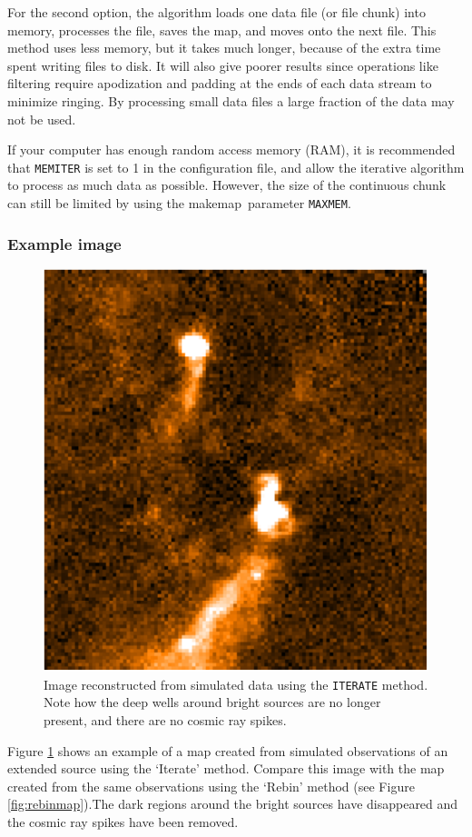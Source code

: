 \documentclass[twoside,11pt]{article}
\newcommand{\xref}[3]{#1}
\renewcommand{\_}{\texttt{\symbol{95}}}
\newcommand{\task}[1]{\textsf{#1}}
\newcommand{\makemap}{\xref{\task{makemap}}{sun258}{MAKEMAP}}
\newcommand{\aparam}[1]{\texttt{#1}}     %
\newcommand{\cparam}[1]{\texttt{#1}}     %
\begin{document}
For the second option, the algorithm loads one data file (or file
chunk) into memory, processes the file, saves the map, and moves onto
the next file. This method uses less memory, but it takes much longer,
because of the extra time spent writing files to disk. It will also
give poorer results since operations like filtering require
apodization and padding at the ends of each data stream to minimize
ringing. By processing small data files a large fraction of the data
may not be used.

If your computer has enough random access memory (RAM), it is
recommended that \cparam{MEMITER} is set to 1 in the configuration
file, and allow the iterative algorithm to process as much data as
possible. However, the size of the continuous chunk can still be
limited by using the \makemap\ parameter \aparam{MAXMEM}.

\subsubsection{Example image}

\begin{figure}[htb]
  \begin{center}
    \includegraphics[width=0.7\linewidth]{sun258_itermap}
    \caption{Image reconstructed from simulated data using the
      \aparam{ITERATE} method. Note how the deep wells around bright
      sources are no longer present, and there are no cosmic ray
      spikes.}
    \label{fig:itermap}
  \end{center}
\end{figure}

Figure \ref{fig:itermap} shows an example of a map created from
simulated observations of an extended source using the `Iterate'
method. Compare this image with the map created from the same
observations using the `Rebin' method (see Figure
\ref{fig:rebinmap}).The dark regions around the bright sources have
disappeared and the cosmic ray spikes have been removed.
\end{document}
